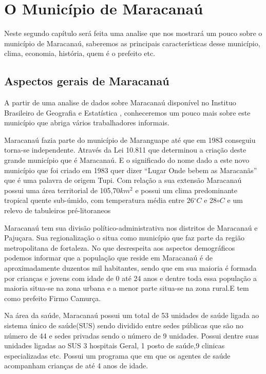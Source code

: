 \chapter{O Município de Maracanaú}

Neste segundo capítulo será feita uma analise que nos mostrará um pouco sobre o município de Maracanaú,
saberemos as principais características desse município, clima, economia, história, quem é o prefeito etc.

\section{Aspectos gerais de Maracanaú}

A partir de uma analise de dados sobre Maracanaú disponível no Instituo Brasileiro de Geografia e Estatística \cite{demografico2000resultados}, 
conheceremos um pouco mais sobre este município que abriga vários trabalhadores informais. 

Maracanaú fazia parte do município de Maranguape até que em 1983 conseguiu torna-se independente. Através da Lei 
10.811 que determinou a criação deste grande município que é Maracanaú. E o significado do nome dado a este novo 
município que foi criado em 1983 quer dizer ``Lugar Onde bebem as Maracanãs'' que é uma palavra de origem Tupi.
Com relação a sua extensão Maracanaú possui uma área territorial de 105,70$km^2$ e possui um clima predominante 
tropical quente sub-úmido, com temperatura média entre 26$^{\circ}C$ e 28${\circ}C$ e um relevo de tabuleiros pré-litoraneos

Maracanaú tem sua divisão político-administrativa nos distritos de Maracanaú e Pajuçara. Sua regionalização o 
situa como município que faz parte da região metropolitana de fortaleza. No que desrespeita aos aspectos 
demográficos podemos informar que a população que reside em Maracanaú é de aproximadamente duzentos mil 
habitantes, sendo que em sua maioria é formada por crianças e jovens com idade de 0 até 24 anos e dentre 
toda essa população a maioria situa-se na zona urbana e a menor parte situa-se na zona rural.E tem como 
prefeito Firmo Camurça.

Na área da saúde, Maracanaú possui um total de 53 unidades de saúde ligada ao sistema único de saúde(SUS) 
sendo dividido entre sedes públicas  que são no número de 44 e sedes privadas sendo o número de 9 unidades.
Possui dentre suas unidades ligadas ao SUS 3 hospitais Geral, 1 posto de saúde,9 clinicas especializadas 
etc. Possui um programa que em que os agentes de saúde acompanham crianças de até 4 anos de idade. 

